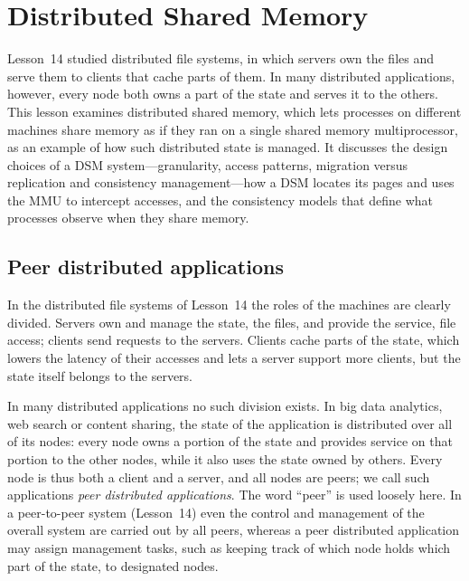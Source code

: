 \documentclass[../main.tex]{subfiles}
\begin{document}
\chapter{Distributed Shared Memory}

Lesson~14 studied distributed file systems, in which servers own the files
and serve them to clients that cache parts of them.  In many distributed
applications, however, every node both owns a part of the state and serves
it to the others.  This lesson examines distributed shared memory, which
lets processes on different machines share memory as if they ran on a
single shared memory multiprocessor, as an example of how such distributed
state is managed.  It discusses the design choices of a DSM
system---granularity, access patterns, migration versus replication and
consistency management---how a DSM locates its pages and uses the MMU to
intercept accesses, and the consistency models that define what processes
observe when they share memory.

\section{Peer distributed applications}
\label{sec:l15-peer}

In the distributed file systems of Lesson~14 the roles of the machines are
clearly divided.  Servers own and manage the state, the files,
and provide the service, file access; clients
send requests to the servers.  Clients cache parts of the state, which
lowers the latency of their accesses and lets a server support more
clients, but the state itself belongs to the servers.

In many distributed applications no such division exists.  In big data
analytics, web search or content sharing, the state of the application is
distributed over all of its nodes: every node owns a portion of the state
and provides service on that portion to the other nodes, while it also
uses the state owned by others.  Every node is thus both a client and a
server, and all nodes are peers; we call such applications \emph{peer
distributed applications}.  The word \enquote{peer} is used loosely here.
In a peer-to-peer system (Lesson~14) even the control
and management of the overall system are carried out by all peers, whereas
a peer distributed application may assign management tasks, such as
keeping track of which node holds which part of the state, to designated
nodes.
\end{document}
